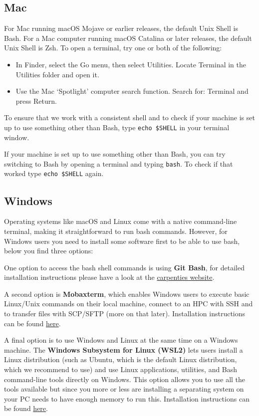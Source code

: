 \documentclass[
  letterpaper,
  DIV=11,
  numbers=noendperiod]{scrreprt}
\providecommand{\tightlist}{%
  \setlength{\itemsep}{0pt}\setlength{\parskip}{0pt}}\usepackage{longtable,booktabs,array}
\begin{document}
\subsection{Mac}\label{mac}

For Mac running macOS Mojave or earlier releases, the default Unix Shell
is Bash. For a Mac computer running macOS Catalina or later releases,
the default Unix Shell is Zsh. To open a terminal, try one or both of
the following:

\begin{itemize}
\tightlist
\item
  In Finder, select the Go menu, then select Utilities. Locate Terminal
  in the Utilities folder and open it.
\item
  Use the Mac `Spotlight' computer search function. Search for: Terminal
  and press Return.
\end{itemize}

To ensure that we work with a consistent shell and to check if your
machine is set up to use something other than Bash, type
\texttt{echo\ \$SHELL} in your terminal window.

If your machine is set up to use something other than Bash, you can try
switching to Bash by opening a terminal and typing \texttt{bash}. To
check if that worked type \texttt{echo\ \$SHELL} again.

\subsection{Windows}\label{windows}

Operating systems like macOS and Linux come with a native command-line
terminal, making it straightforward to run bash commands. However, for
Windows users you need to install some software first to be able to use
bash, below you find three options:

One option to access the bash shell commands is using \textbf{Git Bash},
for detailed installation instructions please have a look at the
\href{https://carpentries.github.io/workshop-template/install_instructions/\#shell-windows}{carpenties
website}.

A second option is \textbf{Mobaxterm}, which enables Windows users to
execute basic Linux/Unix commands on their local machine, connect to an
HPC with SSH and to transfer files with SCP/SFTP (more on that later).
Installation instructions can be found
\href{https://hpc.ncsu.edu/Documents/mobaxterm.php}{here}.

A final option is to use Windows and Linux at the same time on a Windows
machine. The \textbf{Windows Subsystem for Linux (WSL2)} lets users
install a Linux distribution (such as Ubuntu, which is the default Linux
distribution, which we recommend to use) and use Linux applications,
utilities, and Bash command-line tools directly on Windows. This option
allows you to use all the tools available but since you more or less are
installing a separating system on your PC needs to have enough memory to
run this. Installation instructions can be found
\href{https://learn.microsoft.com/en-us/windows/wsl/install}{here}.
\end{document}
